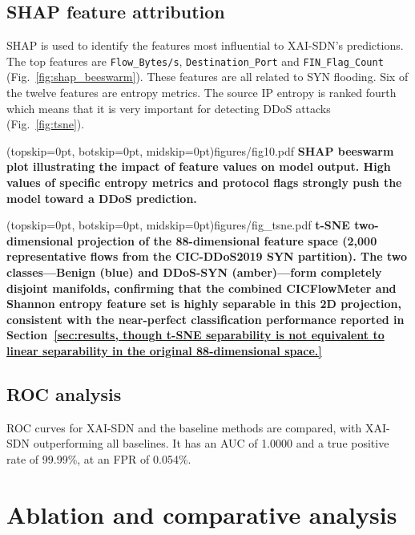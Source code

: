\documentclass{ieeeaccess}
\begin{document}
\subsection{SHAP feature attribution}
SHAP is used to identify the features most influential to XAI-SDN's predictions. The top features are \texttt{Flow\_Bytes/s}, \texttt{Destination\_Port} and \texttt{FIN\_Flag\_Count} (Fig.~\ref{fig:shap_beeswarm}). These features are all related to SYN flooding. Six of the twelve features are entropy metrics. The source IP entropy is ranked fourth which means that it is very important for detecting DDoS attacks (Fig.~\ref{fig:tsne}).

\Figure[t!](topskip=0pt, botskip=0pt, midskip=0pt){figures/fig10.pdf}
{ \textbf{SHAP beeswarm plot illustrating the impact of feature values on model output. High values of specific entropy metrics and protocol flags strongly push the model toward a DDoS prediction.}\label{fig:shap_beeswarm}}

\Figure[t!](topskip=0pt, botskip=0pt, midskip=0pt){figures/fig_tsne.pdf}
{ \textbf{t-SNE two-dimensional projection of the 88-dimensional feature space (2,000 representative flows from the CIC-DDoS2019 SYN partition). The two classes---Benign (blue) and DDoS-SYN (amber)---form completely disjoint manifolds, confirming that the combined CICFlowMeter and Shannon entropy feature set is highly separable in this 2D projection, consistent with the near-perfect classification performance reported in Section~\ref{sec:results, though t-SNE separability is not equivalent to linear separability in the original 88-dimensional space.}}\label{fig:tsne}}

\subsection{ROC analysis}
ROC curves for XAI-SDN and the baseline methods are compared, with XAI-SDN outperforming all baselines. It has an AUC of 1.0000 and a true positive rate of 99.99\%, at an FPR of 0.054\%.

\section{Ablation and comparative analysis}
\label{sec:comparative}
\end{document}
